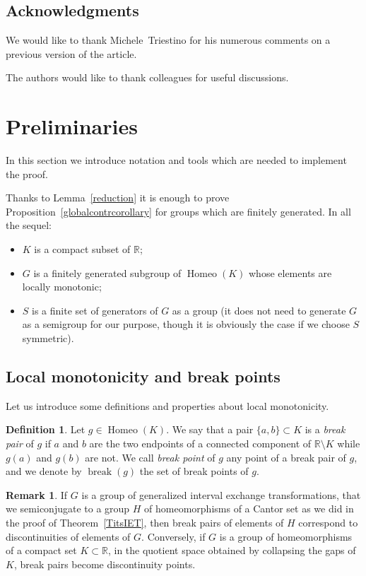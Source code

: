\documentclass[10pt]{amsart}
\theoremstyle{definition}\newtheorem{defi}[theo]{Definition}\newtheorem{rema}[theo]{Remark}\newtheorem{exam}[theo]{Example}\newtheorem{exem}[theo]{Example}\newtheorem{nota}[theo]{Notation}
\DeclareMathOperator{\breaKk}{break}
\DeclareMathOperator{\Homeo}{Homeo}
\newcommand{\R}{\mathbb{R}}
\newcounter{setofcase}
\newcounter{case}[setofcase]
\begin{document}
\subsection*{Acknowledgments}
We would like to thank Michele~Triestino for his numerous comments on a previous version of the article.

The authors would like to thank colleagues for useful discussions.

\pagebreak
\section{Preliminaries}\label{pre}

In this section we introduce notation and tools which are needed to implement the proof.

Thanks to Lemma~\ref{reduction} it is enough to prove Proposition~\ref{globalcontrcorollary} for groups which are finitely generated. In all the sequel:
\begin{itemize}
\item $K$ is a compact subset of $\R$;
\item $G$ is a finitely generated subgroup of $\Homeo(K)$ whose elements are locally monotonic;
\item $S$ is a finite set of generators of $G$ as a group (it does not need to generate $G$ as a semigroup for our purpose, though it is obviously the case if we choose $S$ symmetric).
\end{itemize}

\subsection{Local monotonicity and break points}

Let us introduce some definitions and properties about local monotonicity.

\begin{defi}
Let $g \in \Homeo(K)$. We say that a pair $\{a,b\}\subset K$ is a \emph{break pair} of $g$ if $a$ and $b$ are the two endpoints of a connected component of $\R \setminus K$ while $g(a)$ and $g(b)$ are not. We call \emph{break point} of $g$ any point of a break pair of $g$, and we denote by $\breaKk(g)$ the set of break points of $g$.
\end{defi}

\begin{rema}
If $G$ is a group of generalized interval exchange transformations, that we semiconjugate to a group $H$ of homeomorphisms of a Cantor set as we did in the proof of Theorem~\ref{TitsIET}, then break pairs of elements of $H$ correspond to discontinuities of elements of $G$. Conversely, if $G$ is a group of homeomorphisms of a compact set $K\subset \R$, in the quotient space obtained by collapsing the gaps of $K$, break pairs become discontinuity points.
\end{rema}
\end{document}
